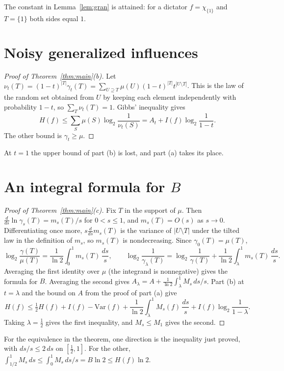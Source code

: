 \documentclass[11pt]{amsart}
\theoremstyle{remark}
\newcommand{\Var}{\mathrm{Var}}
\begin{document}
The constant in Lemma~\ref{lem:gran} is attained: for a dictator $f=\chi_{\{1\}}$ and $T=\{1\}$ both sides equal $1$.

\section{Noisy generalized influences}\label{sec:thin}

\begin{proof}[Proof of Theorem~\ref{thm:main}(b)]
Let $\nu_t(T)=(1-t)^{|T|}\gamma_t(T)=\sum_{U\supseteq T}\mu(U)(1-t)^{|T|}t^{|U\setminus T|}$. This is the law of the
random set obtained from $U$ by keeping each element independently with probability $1-t$, so $\sum_T\nu_t(T)=1$.
Gibbs' inequality gives
\[
H(f)\le\sum_S\mu(S)\log_2\frac1{\nu_t(S)}=A_t+I(f)\log_2\frac1{1-t}.
\]
The other bound is $\gamma_t\ge\mu$.
\end{proof}

At $t=1$ the upper bound of part (b) is lost, and part (a) takes its place.

\section{An integral formula for \texorpdfstring{$B$}{B}}\label{sec:tilt}

\begin{proof}[Proof of Theorem~\ref{thm:main}(c)]
Fix $T$ in the support of $\mu$. Then $\frac{d}{ds}\ln\gamma_s(T)=m_s(T)/s$ for $0<s\le1$, and $m_s(T)=O(s)$ as $s\to0$.
Differentiating once more, $s\frac{d}{ds}m_s(T)$ is the variance of $|U\setminus T|$ under the tilted law in the
definition of $m_s$, so $m_s(T)$ is nondecreasing. Since $\gamma_0(T)=\mu(T)$,
\[
\log_2\frac{\gamma(T)}{\mu(T)}=\frac1{\ln2}\int_0^1m_s(T)\,\frac{ds}{s},\qquad
\log_2\frac{1}{\gamma_\lambda(T)}=\log_2\frac1{\gamma(T)}+\frac1{\ln2}\int_\lambda^1m_s(T)\,\frac{ds}{s}.
\]
Averaging the first identity over $\mu$ (the integrand is nonnegative) gives the formula for $B$. Averaging the second
gives $A_\lambda=A+\frac1{\ln2}\int_\lambda^1M_s\,ds/s$. Part (b) at $t=\lambda$ and the bound on $A$ from the proof of
part (a) give
\[
H(f)\le\tfrac12H(f)+I(f)-\Var(f)+\frac1{\ln2}\int_\lambda^1M_s(f)\,\frac{ds}{s}+I(f)\log_2\frac1{1-\lambda}.
\]
Taking $\lambda=\tfrac12$ gives the first inequality, and $M_s\le M_1$ gives the second.
\end{proof}

For the equivalence in the theorem, one direction is the inequality just proved, with $ds/s\le 2\,ds$ on $[\tfrac12,1]$.
For the other, $\int_{1/2}^1M_s\,ds\le\int_0^1M_s\,ds/s=B\ln2\le H(f)\ln 2$.
\end{document}
